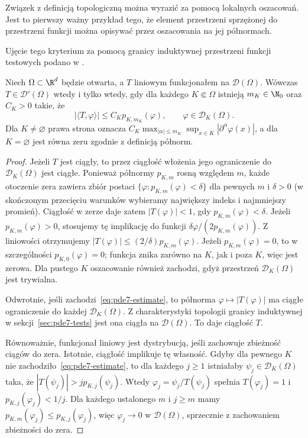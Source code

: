 Związek z definicją topologiczną można wyrazić za pomocą lokalnych
oszacowań. Jest to pierwszy ważny przykład tego, że element
przestrzeni sprzężonej do przestrzeni funkcji można opisywać
przez oszacowania na jej półnormach.

Ujęcie tego kryterium za pomocą granicy induktywnej przestrzeni funkcji testowych podano w .

\begin{twierdzenie}
\label{thm:pde7-local-order}
Niech $\Omega\subset\R^d$ będzie otwarta, a $T$ liniowym funkcjonałem
na $\mathcal D(\Omega)$. Wówczas $T\in\mathcal D'(\Omega)$ wtedy i tylko
wtedy, gdy dla każdego $K\Subset\Omega$ istnieją $m_K\in\N_0$
oraz $C_K>0$ takie, że
\begin{equation}\label{eq:pde7-estimate}
 |\langle T,\varphi\rangle|\le C_K p_{K,m_K}(\varphi),
 \qquad \varphi\in\mathcal D_K(\Omega).
\end{equation}
Dla $K\ne\varnothing$ prawa strona oznacza
$C_K\max_{|\alpha|\le m_K}\sup_{x\in K}
|\partial^\alpha\varphi(x)|$, a dla $K=\varnothing$
jest równa zeru zgodnie z definicją półnorm.
\end{twierdzenie}
\begin{proof}
Jeżeli $T$ jest ciągły, to przez ciągłość włożenia
jego ograniczenie do $\mathcal D_K(\Omega)$ jest ciągłe.
Ponieważ półnormy $p_{K,m}$ rosną względem $m$,
każde otoczenie zera zawiera zbiór postaci
$\{\varphi:p_{K,m}(\varphi)<\delta\}$ dla pewnych
$m$ i $\delta>0$ (w skończonym przecięciu warunków
wybieramy największy indeks i najmniejszy promień).
Ciągłość w zerze daje zatem $|T(\varphi)|<1$,
gdy $p_{K,m}(\varphi)<\delta$.
Jeżeli $p_{K,m}(\varphi)>0$, stosujemy tę implikację
do funkcji $\delta\varphi/(2p_{K,m}(\varphi))$.
Z liniowości otrzymujemy
$|T(\varphi)|\le(2/\delta)p_{K,m}(\varphi)$.
Jeżeli $p_{K,m}(\varphi)=0$, to w szczególności
$p_{K,0}(\varphi)=0$; funkcja znika zarówno na $K$,
jak i poza $K$, więc jest zerowa. Dla pustego $K$
oszacowanie również zachodzi, gdyż przestrzeń
$\mathcal D_K(\Omega)$ jest trywialna.

Odwrotnie, jeśli zachodzi~\eqref{eq:pde7-estimate},
to półnorma $\varphi\mapsto|T(\varphi)|$ ma ciągłe
ograniczenie do każdej $\mathcal D_K(\Omega)$.
Z charakterystyki topologii granicy induktywnej
w sekcji~\ref{sec:pde7-tests} jest ona ciągła na
$\mathcal D(\Omega)$. To daje ciągłość $T$.

Równoważnie, funkcjonał liniowy jest dystrybucją,
jeśli zachowuje zbieżność ciągów do zera. Istotnie,
ciągłość implikuje tę własność. Gdyby dla pewnego
$K$ nie zachodziło~\eqref{eq:pde7-estimate}, to dla
każdego $j\ge1$ istniałaby $\psi_j\in\mathcal D_K(\Omega)$
taka, że $|T(\psi_j)|>j p_{K,j}(\psi_j)$.
Wtedy $\varphi_j=\psi_j/T(\psi_j)$ spełnia
$T(\varphi_j)=1$ i $p_{K,j}(\varphi_j)<1/j$.
Dla każdego ustalonego $m$ i $j\ge m$ mamy
$p_{K,m}(\varphi_j)\le p_{K,j}(\varphi_j)$, więc
$\varphi_j\to0$ w $\mathcal D(\Omega)$, sprzecznie
z zachowaniem zbieżności do zera.
\end{proof}

